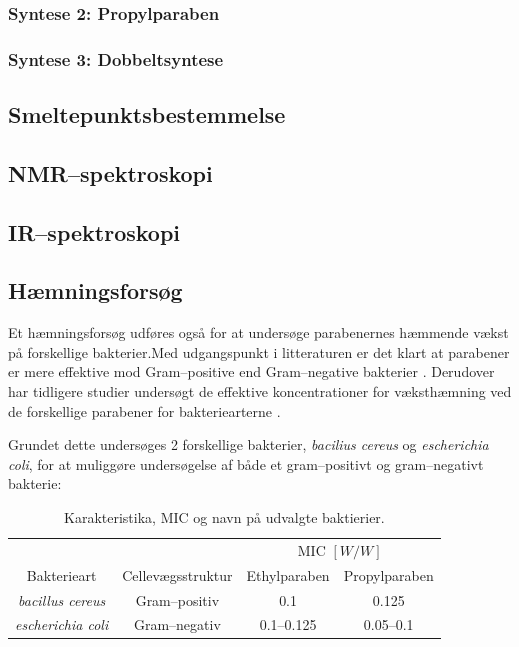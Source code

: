     \subsubsection{Syntese 2: Propylparaben}
    

    \subsubsection{Syntese 3: Dobbeltsyntese}
        

    \subsection{Smeltepunktsbestemmelse}
    

    \subsection{NMR--spektroskopi}
    

    \subsection{IR--spektroskopi}
    

    \subsection{Hæmningsforsøg}
    Et hæmningsforsøg udføres også for at undersøge parabenernes hæmmende vækst på forskellige bakterier.Med udgangspunkt i litteraturen er det klart at parabener er mere effektive mod Gram--positive end Gram--negative bakterier \parencite{Joao2021}. Derudover har tidligere studier undersøgt de effektive koncentrationer for væksthæmning ved de forskellige parabener for bakteriearterne \parencite{Wies2019}. 

    Grundet dette undersøges 2 forskellige bakterier, \textit{bacilius cereus} og \textit{escherichia coli}, for at muliggøre undersøgelse af både et gram--positivt og gram--negativt bakterie:
    \begin{table}[H]\centering
        \caption{Karakteristika, MIC og navn på udvalgte baktierier.}
        \begin{tabular}{cccc}
            \toprule
            & & \multicolumn{2}{c}{MIC $\left[\si{W\per W}\right]$} \\
            \cmidrule(r){3-4}
            Bakterieart & Cellevægsstruktur & Ethylparaben & Propylparaben \\
            \midrule
            \textit{bacillus cereus} & Gram--positiv & 0.1 & 0.125 \\
            \textit{escherichia coli} & Gram--negativ & 0.1--0.125 & 0.05--0.1 \\
            \bottomrule
        \end{tabular}
    \end{table}
    
